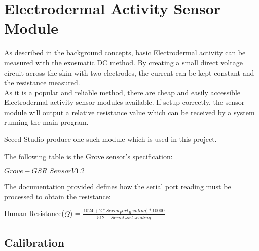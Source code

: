 \documentclass{report}
\begin{document}
\section{Electrodermal Activity Sensor Module}
As described in the background concepts, basic Electrodermal activity can be measured 
with the exosmatic DC method. By creating a small direct voltage circuit across the skin 
with two electrodes, the current can be kept constant and the resistance measured.\\
As it is a popular and reliable method, there are cheap and easily accessible Electrodermal activity sensor modules available.
If setup correctly, the sensor module will output a relative resistance value which can be received by a system running the main program.

Seeed Studio \citep{seeed2014sensor} produce one such module which is used in this project.

The following table is the Grove sensor's specification:

\begin{center}
$Grove - GSR\_Sensor V1.2$\\
\end{center}

The documentation provided defines how the serial port reading must be processed to obtain the resistance:

\centerline{Human Resistance($\Omega$) = $\frac{1024 + 2 * Serial_Port_Reading) * 10000}{512 - Serial_Port_Reading}$}

\subsection{Calibration}
\end{document}
